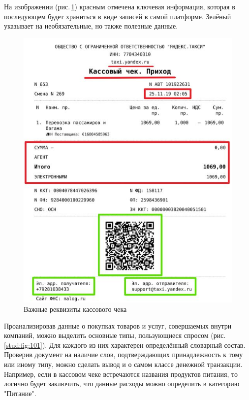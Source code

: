 \documentclass[14pt]{mmcs_article}
\begin{document}
На изображении (рис.\,\ref{stud:fig:01}) красным отмечена ключевая информация, которая в последующем будет храниться в виде записей в самой платформе. Зелёный указывает на необязательные, но также полезные данные. 
\begin{figure}[H]
  \centering
  \includegraphics[scale=0.5]{boxes.JPG}
  \caption{Важные реквизиты кассового чека}\label{stud:fig:01}
\end{figure}
Проанализировав данные о покупках товаров и услуг, совершаемых внутри компаний, можно выделить основные типы, пользующиеся спросом (рис.\,\ref{stud:fig:101}). Для каждого из них характерен определённый словарный состав. Проверив документ на наличие слов, подтверждающих принадлежность к тому или иному типу, можно сделать вывод и о самом классе денежной транзакции. Например, если в кассовом чеке встречаются названия продуктов питания, то логично будет заключить, что данные расходы можно определить в категорию "Питание".
\end{document}
